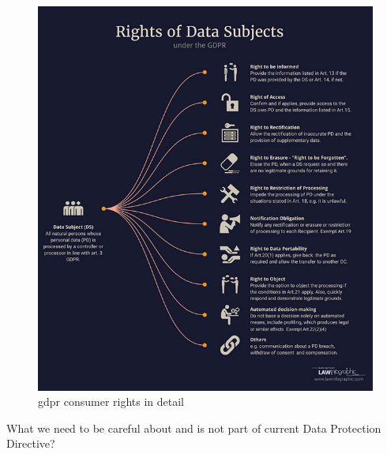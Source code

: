\documentclass[thesis=M,english]{FITthesis}[2012/06/26]
\begin{document}
\begin{figure}[p!]\centering
	\includegraphics[width=1\textwidth]{pictures/gdpr_subject_rights_detail}
	\caption{\acrshort{gdpr} consumer rights in detail \cite{gdpr_subject_rights}}\label{fig:gdpr_subject_rights_detail}
\end{figure}

What we need to be careful about and is not part of current Data Protection Directive?
\end{document}
